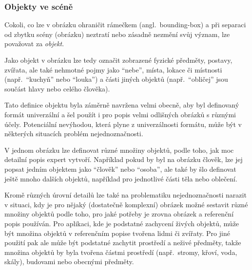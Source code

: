\subsubsection{Objekty ve scéně}\label{subsubsec:objekty_ve_scene}
\newcommand{\objekt}{{\color{red!70!black}\texttt{objekt}}}
Cokoli, co lze v obrázku ohraničit rámečkem (angl.~bounding-box)
a při separaci od zbytku scény (obrázku) neztratí nebo zásadně nezmění svůj význam,
lze považovat za \emph{objekt}.

Jako objekt v obrázku lze tedy označit zobrazené fyzické předměty, postavy, zvířata, ale také nehmotné pojmy jako \enquote{nebe},
místa, lokace či místnosti (např.~\enquote{kuchyň} nebo \enquote{louka}) a části jiných objektů (např.~\enquote{obličej}
jsou součást hlavy nebo celého člověka).

Tato definice objektu byla záměrně navržena velmi obecně, aby byl definovaný formát univerzální a šel použít i pro
popis velmi odlišných obrázků s různými účely.
Potenciální nevýhodou, která plyne z univerzálnosti formátu, může být v některých situacích problém nejednoznačnosti.

V jednom obrázku lze definovat různé množiny objektů, podle toho, jak moc detailní popis expert vytvoří.
Například pokud by byl na obrázku člověk, lze jej popsat jedním objektem jako \enquote{člověk} nebo \enquote{osoba},
ale také by šlo definovat ještě mnoho dalších objektů, například pro jednotlivé části těla nebo oblečení.

Kromě různých úrovní detailů lze také na problematiku nejednoznačnosti narazit v situaci, kdy je pro nějaký (dostatečně komplexní) obrázek
možné sestavit různé množiny objektů podle toho, pro jaké potřeby je zrovna obrázek a referenční popis používán.
Pro aplikaci, kde je podstatné zachycení živých objektů, může být množina objektů v referenčním popise tvořena lidmi či zvířaty.
Pro jiné použití pak ale může být podstatné zachytit prostředí a neživé předměty,
takže množina objektů by byla tvořena částmi prostředí (např.~stromy, křoví, voda, skály), budovami nebo obecnými předměty.


